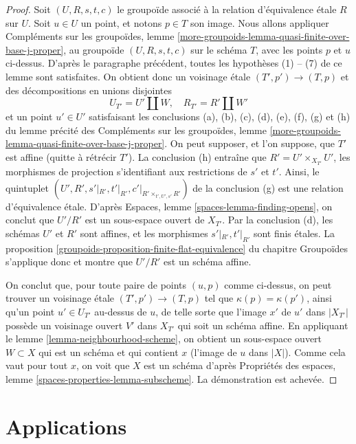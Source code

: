 \begin{proof}
\medskip\noindent
Soit $(U, R, s, t, c)$ le groupoïde associé à la relation
d'équivalence étale $R$ sur $U$. Soit $u \in U$ un point, et
notons $p \in T$ son image. Nous allons appliquer
Compléments sur les groupoïdes,
lemme \ref{more-groupoids-lemma-quasi-finite-over-base-j-proper},
au groupoïde $(U, R, s, t, c)$ sur le schéma $T$, avec les
points $p$ et $u$ ci-dessus.
D'après le paragraphe précédent, toutes les
hypothèses (1) -- (7) de ce lemme sont satisfaites.
On obtient donc un voisinage étale
$(T', p') \to (T, p)$ et des décompositions en unions disjointes
$$
U_{T'} = U' \amalg W, \quad
R_{T'} = R' \amalg W'
$$
et un point $u' \in U'$ satisfaisant les conclusions
(a), (b), (c), (d), (e), (f), (g) et (h) du lemme précité des
Compléments sur les groupoïdes,
lemme \ref{more-groupoids-lemma-quasi-finite-over-base-j-proper}.
On peut supposer, et l'on suppose, que $T'$ est affine (quitte à rétrécir $T'$).
La conclusion (h) entraîne que $R' = U' \times_{X_{T'}} U'$, les morphismes de
projection s'identifiant aux restrictions de $s'$ et $t'$.
Ainsi, le quintuplet $(U', R', s'|_{R'}, t'|_{R'}, c'|_{R' \times_{t', U', s'} R'})$ de la
conclusion (g) est une relation d'équivalence étale. D'après
Espaces, lemme \ref{spaces-lemma-finding-opens},
on conclut que $U'/R'$ est un sous-espace ouvert de $X_{T'}$. Par la conclusion (d),
les schémas $U'$ et $R'$ sont affines, et les morphismes
$s'|_{R'}, t'|_{R'}$ sont finis étales. La
proposition \ref{groupoids-proposition-finite-flat-equivalence} du chapitre Groupoïdes
s'applique donc et montre que $U'/R'$ est un schéma affine.

\medskip\noindent
On conclut que, pour toute paire de points $(u, p)$ comme ci-dessus, on peut
trouver un voisinage étale $(T', p') \to (T, p)$ tel que
$\kappa(p) = \kappa(p')$, ainsi qu'un point $u' \in U_{T'}$ au-dessus de $u$,
de telle sorte que l'image $x'$ de $u'$ dans $|X_{T'}|$ possède un voisinage ouvert
$V'$ dans $X_{T'}$ qui soit un schéma affine. En appliquant le
lemme \ref{lemma-neighbourhood-scheme},
on obtient un sous-espace ouvert $W \subset X$ qui est un schéma et
qui contient $x$ (l'image de $u$ dans $|X|$).
Comme cela vaut pour tout $x$, on voit que $X$
est un schéma d'après
Propriétés des espaces, lemme \ref{spaces-properties-lemma-subscheme}.
La démonstration est achevée.
\end{proof}



\section{Applications}
\label{section-applications}


